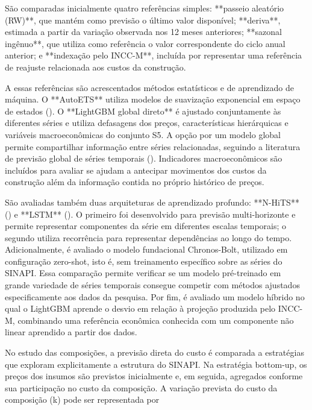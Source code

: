 São comparadas inicialmente quatro referências simples: **passeio aleatório (RW)**, que mantém como previsão o último valor 
disponível; **deriva**, estimada a partir da variação observada nos 12 meses anteriores; **sazonal ingênuo**, que utiliza como 
referência o valor correspondente do ciclo anual anterior; e **indexação pelo INCC-M**, incluída por representar uma referência 
de reajuste relacionada aos custos da construção.

A essas referências são acrescentados métodos estatísticos e de aprendizado de máquina. O **AutoETS** utiliza modelos de 
suavização exponencial em espaço de estados (). O **LightGBM global direto** é ajustado conjuntamente às 
diferentes séries e utiliza defasagens dos preços, características hierárquicas e variáveis macroeconômicas do conjunto S5. A 
opção por um modelo global permite compartilhar informação entre séries relacionadas, seguindo a literatura de previsão global 
de séries temporais (). Indicadores macroeconômicos são 
incluídos para avaliar se ajudam a antecipar movimentos dos custos da construção além da informação contida no próprio histórico 
de preços.

São avaliadas também duas arquiteturas de aprendizado profundo: **N-HiTS** () e **LSTM** 
(). O primeiro foi desenvolvido para previsão multi-horizonte e permite representar 
componentes da série em diferentes escalas temporais; o segundo utiliza recorrência para representar dependências ao longo do 
tempo. Adicionalmente, é avaliado o modelo fundacional Chronos-Bolt, utilizado em configuração zero-shot, isto é, sem treinamento 
específico sobre as séries do SINAPI. Essa comparação permite verificar se um modelo pré-treinado em grande variedade de séries 
temporais consegue competir com métodos ajustados especificamente aos dados da pesquisa. Por fim, é avaliado um modelo híbrido no 
qual o LightGBM aprende o desvio em relação à projeção produzida pelo INCC-M, combinando uma referência econômica conhecida com 
um componente não linear aprendido a partir dos dados.

No estudo das composições, a previsão direta do custo é comparada a estratégias que exploram explicitamente a estrutura do SINAPI. 
Na estratégia bottom-up, os preços dos insumos são previstos inicialmente e, em seguida, agregados conforme sua participação no 
custo da composição. A variação prevista do custo da composição (k) pode ser representada por


